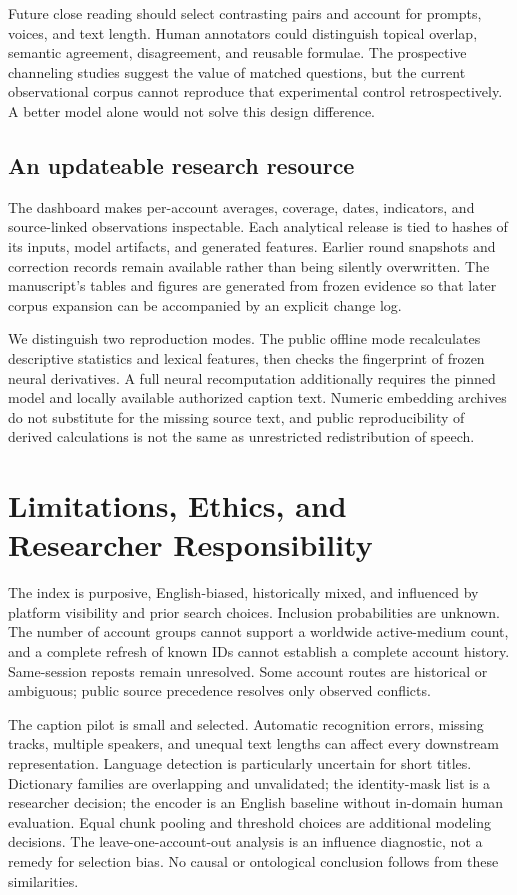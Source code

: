Future close reading should select contrasting pairs and account for prompts, voices, and text length. Human annotators could distinguish topical overlap, semantic agreement, disagreement, and reusable formulae. The prospective channeling studies suggest the value of matched questions, but the current observational corpus cannot reproduce that experimental control retrospectively. A better model alone would not solve this design difference.

\subsection{An updateable research resource}
The dashboard makes per-account averages, coverage, dates, indicators, and source-linked observations inspectable. Each analytical release is tied to hashes of its inputs, model artifacts, and generated features. Earlier round snapshots and correction records remain available rather than being silently overwritten. The manuscript's tables and figures are generated from frozen evidence so that later corpus expansion can be accompanied by an explicit change log.

We distinguish two reproduction modes. The public offline mode recalculates descriptive statistics and lexical features, then checks the fingerprint of frozen neural derivatives. A full neural recomputation additionally requires the pinned model and locally available authorized caption text. Numeric embedding archives do not substitute for the missing source text, and public reproducibility of derived calculations is not the same as unrestricted redistribution of speech.

\section{Limitations, Ethics, and Researcher Responsibility}
The index is purposive, English-biased, historically mixed, and influenced by platform visibility and prior search choices. Inclusion probabilities are unknown. The number of account groups cannot support a worldwide active-medium count, and a complete refresh of known IDs cannot establish a complete account history. Same-session reposts remain unresolved. Some account routes are historical or ambiguous; public source precedence resolves only observed conflicts.

The caption pilot is small and selected. Automatic recognition errors, missing tracks, multiple speakers, and unequal text lengths can affect every downstream representation. Language detection is particularly uncertain for short titles. Dictionary families are overlapping and unvalidated; the identity-mask list is a researcher decision; the encoder is an English baseline without in-domain human evaluation. Equal chunk pooling and threshold choices are additional modeling decisions. The leave-one-account-out analysis is an influence diagnostic, not a remedy for selection bias. No causal or ontological conclusion follows from these similarities.

